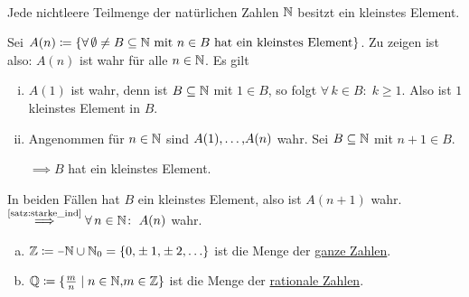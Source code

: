 \documentclass[../ana1.tex]{subfiles}
\begin{document}
\begin{satz}\label{satz:wohlordprinz} \leavevmode \\
	Jede nichtleere Teilmenge der natürlichen Zahlen \(\mathbb{N} \) besitzt ein kleinstes Element.
\end{satz}
\begin{bew}
	Sei \(A(n)\coloneqq \{\forall \, \emptyset \neq B \subseteq \mathbb{N} \text{ mit } n \in B \text{ hat ein kleinstes Element}\} \).
	Zu zeigen ist also: \(A(n) \) ist wahr für alle \(n \in \mathbb{N} \). Es gilt
	\begin{enumerate}[(i)]
		\item \(A(1) \) ist wahr, denn ist \(B \subseteq \mathbb{N} \) mit \(1 \in B \), so folgt \(\forall \, k \in B \colon \; k \geq 1 \).
			  Also ist \(1 \) kleinstes Element in \(B \).
		\item Angenommen für \(n \in \mathbb{N} \) sind \(A(1) \text{,} \ldots \text{,} A(n) \) wahr. Sei \(B \subseteq \mathbb{N} \) mit \(n + 1 \in B \).
		      \(\implies B \) hat ein kleinstes Element.
	\end{enumerate}
	In beiden Fällen hat \(B \) ein kleinstes Element, also ist \(A(n+1) \) wahr.\\
	\(\overset{\text{\autoref{satz:starke_ind}}}{\implies} \forall \, n \in \N \colon \; A(n) \) wahr.
\end{bew}

\iftoggle{short}{}{\newpage}%

\begin{notation}\leavevmode
	\begin{enumerate}[(a)]
		\item \(\Z \coloneqq \minus \N \cup \N_0 = \set{0 \ko \pm 1 \ko \pm 2  \ko \ldots} \) ist die Menge der \underline{ganze Zahlen}.
		\item \(\mathbb{Q} \coloneqq \{\frac{m}{n} \; \vert \; n \in \mathbb{N} \text{,} m \in \mathbb{Z} \} \) ist die Menge der \underline{rationale Zahlen}.
	\end{enumerate}
\end{notation}
\end{document}
